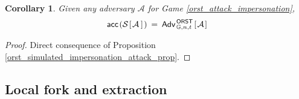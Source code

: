 \documentclass[psamsfonts, reqno]{amsart}
\newtheorem{cor}[thm]{Corollary}
\theoremstyle{definition}
\theoremstyle{remark}
\numberwithin{equation}{section}
\begin{document}
\begin{cor}\label{equality_intermediate}
Given any adversary $\mathcal{A}$
for Game \ref{orst_attack_impersonation},
\vspace{5pt}
\begin{equation}
	\mathsf{acc}\hspace{1pt}(
		\mathcal{S}
			\hspace{1pt}[
				\hspace{1pt}\mathcal{A}
		\hspace{2pt}]\hspace{1pt})
	\hspace{2pt}
	=
	\hspace{2pt}
	\mathsf{Adv}
		_{\hspace{1pt}\mathbb{G}, n, t}
		^{\hspace{1pt}\mathsf{ORST}}\hspace{1pt}
		[
			\hspace{1pt}
			\mathcal{A}
			\hspace{1pt}
		]
\vspace{5pt}
\end{equation}
\end{cor}

\begin{proof}
Direct consequence of Proposition
\ref{orst_simulated_impersonation_attack_prop}.
\end{proof}

\subsection{Local fork and extraction}\label{section_extractability}
\end{document}
